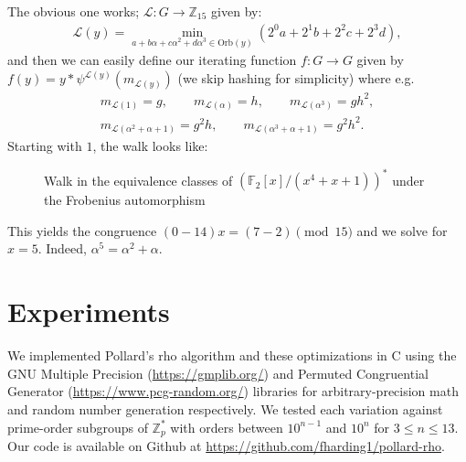 \documentclass{article}
\newcommand{\ZZ}{\mathbb{Z}}
\newcommand{\FF}{\mathbb{F}}
\newcommand{\Orb}{\mathrm{Orb}}
\begin{document}
The obvious one works; $\mathcal{L} : G \to \ZZ_{15}$ given by:
\begin{align*}
	\mathcal{L}(y) = \min_{a+b\alpha+c\alpha^2+d\alpha^3 \in \Orb(y)} (2^0a+2^1b+2^2c+2^3d),
\end{align*}
and then we can easily define our iterating function $f: G \to G$ given by $f(y) = y*\psi^{\mathcal{L}(y)}(m_{\mathcal{L}(y)})$ (we skip hashing for simplicity) where e.g.
\begin{align*}
	m_{\mathcal{L}(1)}=g, \qquad
	m_{\mathcal{L}(\alpha)} =h, \qquad
	m_{\mathcal{L}(\alpha^3)}=gh^2, \\
	m_{\mathcal{L}(\alpha^2+\alpha+1)}=g^2h, \qquad
	m_{\mathcal{L}(\alpha^3+\alpha+1)}=g^2h^2.
\end{align*}
Starting with $1$, the walk looks like:
\begin{figure}[H]
	\centering
	\caption{Walk in the equivalence classes of $(\FF_2[x]/(x^4+x+1))^*$ under the Frobenius automorphism}
\end{figure}
This yields the congruence $(0-14)x=(7-2) \pmod {15}$ and we solve for $x=5$. Indeed, $\alpha^5 = \alpha^2+\alpha$.
\fi

\section{Experiments}

We implemented Pollard's rho algorithm and these optimizations in C using the GNU Multiple Precision (\href{https://gmplib.org/}{https://gmplib.org/}) and Permuted Congruential Generator (\href{https://www.pcg-random.org/}{https://www.pcg-random.org/}) libraries for arbitrary-precision math and random number generation respectively. We tested each variation against prime-order subgroups of $\ZZ_p^*$ with orders between $10^{n-1}$ and $10^n$ for $3 \leq n \leq 13$. Our code is available on Github at \href{https://github.com/fharding1/pollard-rho}{https://github.com/fharding1/pollard-rho}.
\end{document}
